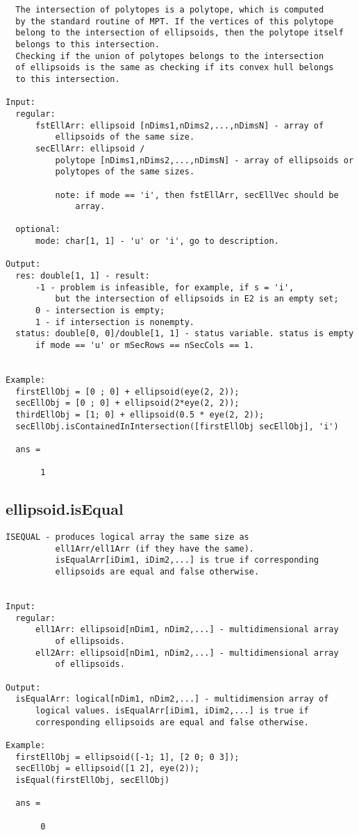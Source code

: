 \begin{verbatim}
  The intersection of polytopes is a polytope, which is computed
  by the standard routine of MPT. If the vertices of this polytope
  belong to the intersection of ellipsoids, then the polytope itself
  belongs to this intersection.
  Checking if the union of polytopes belongs to the intersection
  of ellipsoids is the same as checking if its convex hull belongs
  to this intersection.

Input:
  regular:
      fstEllArr: ellipsoid [nDims1,nDims2,...,nDimsN] - array of
          ellipsoids of the same size.
      secEllArr: ellipsoid /
          polytope [nDims1,nDims2,...,nDimsN] - array of ellipsoids or
          polytopes of the same sizes.

          note: if mode == 'i', then fstEllArr, secEllVec should be
              array.

  optional:
      mode: char[1, 1] - 'u' or 'i', go to description.

Output:
  res: double[1, 1] - result:
      -1 - problem is infeasible, for example, if s = 'i',
          but the intersection of ellipsoids in E2 is an empty set;
      0 - intersection is empty;
      1 - if intersection is nonempty.
  status: double[0, 0]/double[1, 1] - status variable. status is empty
      if mode == 'u' or mSecRows == nSecCols == 1.


Example:
  firstEllObj = [0 ; 0] + ellipsoid(eye(2, 2));
  secEllObj = [0 ; 0] + ellipsoid(2*eye(2, 2));
  thirdEllObj = [1; 0] + ellipsoid(0.5 * eye(2, 2));
  secEllObj.isContainedInIntersection([firstEllObj secEllObj], 'i')

  ans =

       1
\end{verbatim}
\subsection{\texorpdfstring{ellipsoid.isEqual}{isEqual}}\label{method:ellipsoid.isEqual}
\begin{verbatim}
ISEQUAL - produces logical array the same size as
          ell1Arr/ell1Arr (if they have the same).
          isEqualArr[iDim1, iDim2,...] is true if corresponding
          ellipsoids are equal and false otherwise.


Input:
  regular:
      ell1Arr: ellipsoid[nDim1, nDim2,...] - multidimensional array
          of ellipsoids.
      ell2Arr: ellipsoid[nDim1, nDim2,...] - multidimensional array
          of ellipsoids.

Output:
  isEqualArr: logical[nDim1, nDim2,...] - multidimension array of
      logical values. isEqualArr[iDim1, iDim2,...] is true if
      corresponding ellipsoids are equal and false otherwise.

Example:
  firstEllObj = ellipsoid([-1; 1], [2 0; 0 3]);
  secEllObj = ellipsoid([1 2], eye(2));
  isEqual(firstEllObj, secEllObj)

  ans =

       0
\end{verbatim}
